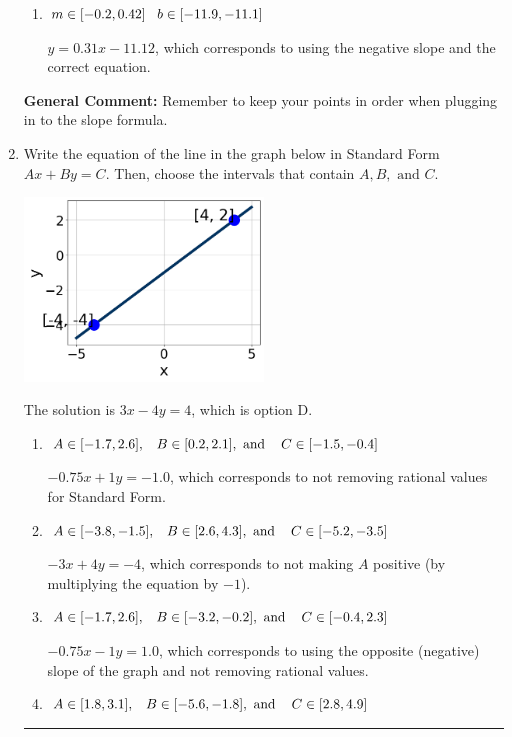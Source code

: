 \documentclass{extbook}[14pt]
\newcommand{\litem}[1]{\item #1

\rule{\textwidth}{0.4pt}}
\begin{document}
\begin{enumerate}
{\begin{enumerate}[label=\Alph*.]
* $y = -0.31x -4.88$, which is the correct option.
\item \( m \in [-0.2, 0.42] \hspace*{3mm} b \in [-11.9, -11.1] \)

 $y = 0.31x -11.12$, which corresponds to using the negative slope and the correct equation.
\end{enumerate}

\textbf{General Comment:} Remember to keep your points in order when plugging in to the slope formula.
}
\litem{
Write the equation of the line in the graph below in Standard Form $Ax+By=C$. Then, choose the intervals that contain $A, B, \text{ and } C$.

\begin{center}
    \includegraphics[width=0.5\textwidth]{../Figures/linearGraphToStandardA.png}
\end{center}


The solution is \( 3x - 4y = 4 \), which is option D.\begin{enumerate}[label=\Alph*.]
\item \( A \in [-1.7, 2.6], \hspace{3mm} B \in [0.2, 2.1], \text{ and } \hspace{3mm} C \in [-1.5, -0.4] \)

 $-0.75x + 1y = -1.0$, which corresponds to not removing rational values for Standard Form.
\item \( A \in [-3.8, -1.5], \hspace{3mm} B \in [2.6, 4.3], \text{ and } \hspace{3mm} C \in [-5.2, -3.5] \)

 $-3x + 4y = -4$, which corresponds to not making $A$ positive (by multiplying the equation by $-1$).
\item \( A \in [-1.7, 2.6], \hspace{3mm} B \in [-3.2, -0.2], \text{ and } \hspace{3mm} C \in [-0.4, 2.3] \)

 $-0.75x - 1y = 1.0$, which corresponds to using the opposite (negative) slope of the graph and not removing rational values.
\item \( A \in [1.8, 3.1], \hspace{3mm} B \in [-5.6, -1.8], \text{ and } \hspace{3mm} C \in [2.8, 4.9] \)


\end{enumerate}}
\end{enumerate}
\end{document}
